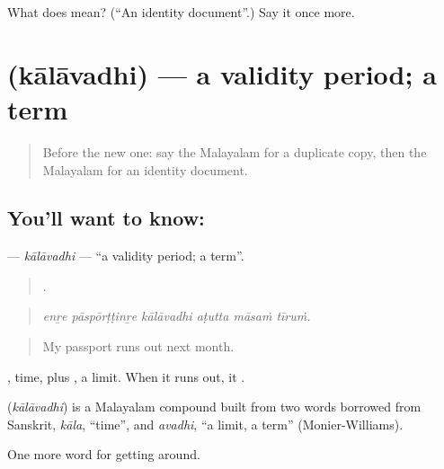 \begin{tcolorbox}[breakable,colback=teal!4,colframe=teal!35!black,title={Before you move on}]
What does  mean? (\textquotedblleft{}An identity document\textquotedblright{}.) Say it once more.
\end{tcolorbox}
\section[\texorpdfstring{\ml{കാലാവധി} (kālāvadhi)}{കാലാവധി (kālāvadhi)}]{ (kālāvadhi) — a validity period; a term}

\label{lesson:ML-C488-kalavadhi}



\begin{quote}
Before the new one: say the Malayalam for a duplicate copy, then the Malayalam for an identity document.
\end{quote}

\subsection*{You'll want to know: }
\textbf{} — \emph{kālāvadhi} — \textquotedblleft{}a validity period; a term\textquotedblright{}.

\begin{quote}
     .
\end{quote}

\begin{quote}
\emph{enṟe pāspōrṭṭinṟe kālāvadhi aṭutta māsaṁ tīruṁ.}
\end{quote}

\begin{quote}
My passport runs out next month.
\end{quote}

, time, plus , a limit. When it runs out, it .

\begin{cousinweb}
\textbf{} (\emph{kālāvadhi}) is a Malayalam compound built from two words borrowed from Sanskrit, \emph{kāla}, \textquotedblleft{}time\textquotedblright{}, and \emph{avadhi}, \textquotedblleft{}a limit, a term\textquotedblright{} (Monier-Williams).
\end{cousinweb}

\begin{grammarlens}[title={What you've built}]
One more word for getting around.
\end{grammarlens}

